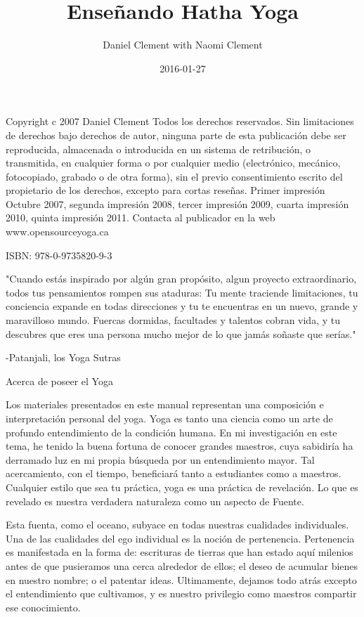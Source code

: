 \documentclass[a4paper]{book}
\title{Enseñando Hatha Yoga}
\date{2016-01-27}
\author{Daniel Clement with Naomi Clement}
\begin{document}
\maketitle

\newpage
Copyright c 2007 Daniel Clement
Todos los derechos reservados. Sin limitaciones de derechos bajo derechos de autor, ninguna parte de esta publicación debe ser reproducida, almacenada o introducida en un sistema de
retribución, o transmitida, en cualquier forma o por cualquier medio (electrónico, mecánico, fotocopiado, grabado o de otra forma), sin el previo consentimiento escrito del propietario de los derechos, excepto para cortas reseñas.
Primer impresión Octubre 2007, segunda impresión 2008, tercer impresión 2009, cuarta impresión 2010, quinta impresión 2011.
Contacta al publicador en la web www.opensourceyoga.ca

ISBN: 978-0-9735820-9-3
\newpage
\tableofcontents
\newpage



\newpage
"Cuando estás inspirado por algún gran propósito, algun proyecto extraordinario, todos tus pensamientos rompen sus ataduras: Tu mente traciende limitaciones, tu conciencia expande en todas direcciones y tu te encuentras en un nuevo, grande y maravilloso mundo. Fuercas dormidas, facultades y talentos cobran vida, y tu descubres que eres una persona mucho mejor de lo que jamás soñaste que serías."

-Patanjali, los Yoga Sutras


\newpage
Acerca de poseer el Yoga

Los materiales presentados en este manual representan una composición e interpretación personal del yoga. Yoga es tanto una ciencia como un arte de profundo entendimiento de la condición humana. En mi investigación en este tema, he tenido la buena fortuna de conocer grandes maestros, cuya sabidiría ha derramado luz en mi propia búsqueda por un entendimiento mayor. Tal acercamiento, con el tiempo, beneficiará tanto a estudiantes como a maestros. Cualquier estilo que sea tu práctica, yoga es una práctica de revelación. Lo que es revelado es nuestra verdadera naturaleza como un aspecto de Fuente.

Esta fuenta, como el oceano, subyace en todas nuestras cualidades individuales. Una de las cualidades del ego individual es la noción de pertenencia. Pertenencia es manifestada en la forma de: escrituras de tierras que han estado aquí milenios antes de que pusieramos una cerca alrededor de ellos; el deseo de acumular bienes en nuestro nombre; o el patentar ideas. Ultimamente, dejamos todo atrás excepto el entendimiento que cultivamos, y es nuestro privilegio como maestros compartir ese conocimiento.
\end{document}
